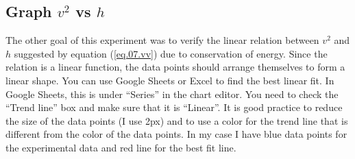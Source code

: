 \subsection{Graph $v^2$ vs $h$}
The other goal of this experiment was to verify the linear relation between $v^{2}$ and $h$ suggested by equation (\ref{eq.07.vv}) due to conservation of energy. Since the relation is a linear function, the data points should arrange themselves to form a linear shape. You can use Google Sheets or Excel to find the best linear fit. In Google Sheets, this is under ``Series'' in the chart editor. You need to check the ``Trend line'' box and make sure that it is ``Linear''. It is good practice to reduce the size of the data points (I use 2px) and to use a color for the trend line that is different from the color of the data points. In my case I have blue data points for the experimental data and red line for the best fit line.

